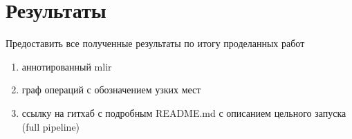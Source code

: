 \section{Результаты}
\label{sec:Chapter5} 

Предоставить все полученные результаты по итогу проделанных работ

\begin{enumerate}
    \item аннотированный mlir
    \item граф операций с обозначением узких мест
    \item ссылку на гитхаб с подробным README.md с описанием цельного запуска (full pipeline) 
\end{enumerate}

\newpage

